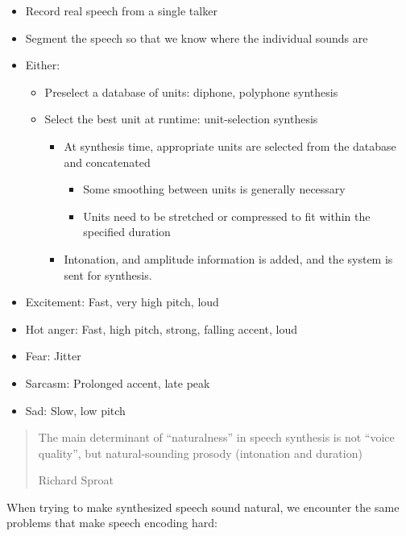 \documentclass[a4paper,landscape,headrule,footrule,xetex]{foils}
\begin{document}
\begin{itemize}
\item Record real speech from a single talker
\item Segment the speech so that we know where the individual sounds are
\item Either:
  \begin{itemize}
  \item Preselect a database of units: diphone, polyphone synthesis
  \item Select the best unit at runtime: unit-selection synthesis
    \begin{itemize}
    \item At synthesis time, appropriate units are selected from the database and concatenated
      \begin{itemize}
      \item Some smoothing between units is generally necessary
      \item Units need to be stretched or compressed to fit within the specified duration
      \end{itemize}
    \item Intonation, and amplitude information is added, and the system is sent for synthesis.
    \end{itemize}
  \end{itemize}
\end{itemize}


\begin{itemize}
\item Excitement: Fast, very high pitch, loud
\item Hot anger: Fast, high pitch, strong, falling accent, loud
\item Fear: Jitter
\item Sarcasm: Prolonged accent, late peak
\item Sad: Slow, low pitch
\end{itemize}

\begin{quote}
  The main determinant of ``naturalness'' in speech synthesis is not
  ``voice quality'', but natural-sounding prosody (intonation and
  duration) 
  \begin{flushright}
    Richard Sproat
  \end{flushright}
\end{quote}

 When trying to make synthesized
speech sound natural, we encounter the same problems that make
speech encoding hard:
\end{document}
